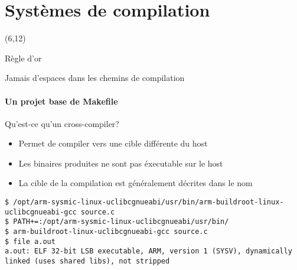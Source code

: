 %
%
%

\part{Systèmes de compilation}

{
\begin{frame}[plain]
  \partpage
  \begin{textblock}{10}(6,12)
    \begin{quote}
      \rmfamily\textit\textbf\color{darkgray}{\large
      ``Real Programmers don't comment their code. If it was hard to write, it should be hard to understand.''}
    \end{quote}
  \end{textblock}
\end{frame}
}

\begin{frame}
  \tableofcontents
\end{frame}



\begin{frame}[fragile=singleslide]{Règle d'or}
  \begin{center}
    \huge{Jamais d'espaces dans les chemins de compilation}
  \end{center}
\end{frame}

\subsection{Un projet base de Makefile}

\begin{frame}[fragile=singleslide]{Qu'est-ce qu'un cross-compiler?}
  \begin{itemize}
  \item Permet de compiler vers une cible différente du host
  \item Les binaires produites ne sont pas éxecutable sur le host
  \item La cible de la compilation est généralement décrites dans le nom
  \end{itemize}
  \begin{lstlisting}
$ /opt/arm-sysmic-linux-uclibcgnueabi/usr/bin/arm-buildroot-linux-uclibcgnueabi-gcc source.c
$ PATH+=:/opt/arm-sysmic-linux-uclibcgnueabi/usr/bin/
$ arm-buildroot-linux-uclibcgnueabi-gcc source.c
$ file a.out
a.out: ELF 32-bit LSB executable, ARM, version 1 (SYSV), dynamically linked (uses shared libs), not stripped
  \end{lstlisting}
\end{frame}

